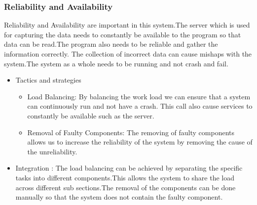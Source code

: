 \subsubsection{Reliability and Availability}	
\begin{flushleft}
Reliability and Availability are important in this system.The server which is used for capturing the data needs to constantly be available to the program so that data can be read.The program also needs to be reliable and gather the information correctly. The collection of incorrect data can cause mishaps with the system.The system as a whole needs to be running and not crash and fail.
\begin{itemize}
\item{Tactics and strategies}
\begin{itemize}
\item{Load Balancing}: By balancing the work load we can ensure that a system can continuously run and not have a crash. This call also cause services to constantly be available such as the server.
\item{Removal of Faulty Components}: The removing of faulty components allows us to increase the reliability of the system by removing the cause of the unreliability.
\end{itemize}

\item{Integration} :
The load balancing can be achieved by separating the specific tasks into different components.This allows the system to share the load across different sub sections.The removal of the components can be done manually so that the system does not contain the faulty component.
\end{itemize}

\end{flushleft}	
		
